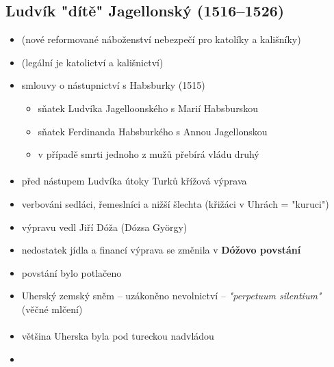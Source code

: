 \subsection{Ludvík "dítě" Jagellonský (1516--1526)}
\begin{itemize}
\item {} (nové reformované náboženství \ra nebezpečí pro katolíky a kališníky)
\item {} (legální je katolictví a kališnictví)
\item smlouvy o nástupnictví s Habsburky (1515)
	\begin{itemize}
	\item sňatek Ludvíka Jagelloonského s Marií Habsburskou
	\item sňatek Ferdinanda Habsburkého s Annou Jagellonskou
	\item v případě smrti jednoho z mužů přebírá vládu druhý
	\end{itemize}
\end{itemize}

\paragraph{}
\begin{itemize}
\item před nástupem Ludvíka útoky Turků \ra křížová výprava
\item verbováni sedláci, řemeslníci a nižší šlechta (křižáci v Uhrách = "kuruci")
\item výpravu vedl Jiří Dóža (Dózsa György)
\item nedostatek jídla a financí \ra výprava se změnila v \textbf{Dóžovo povstání}
\item povstání bylo potlačeno
\item Uherský zemský sněm -- uzákoněno nevolnictví -- \textit{"perpetuum silentium"} (věčné mlčení)
\end{itemize}

\paragraph{}
\begin{itemize}
\item většina Uherska byla pod tureckou nadvládou
\item {}

\end{itemize}


